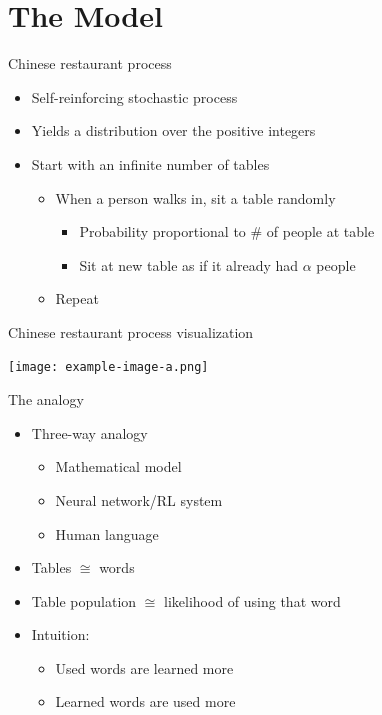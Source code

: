 \documentclass{beamer}
\newif\ifusevizzes
\begin{document}
\section{The Model}

\begin{frame}{Chinese restaurant process}
    \begin{itemize}
        \item Self-reinforcing stochastic process
        \item Yields a distribution over the positive integers
        \item Start with an infinite number of tables
            \begin{itemize}
                \item When a person walks in, sit a table randomly
                    \begin{itemize}
                        \item Probability proportional to \# of people at table
                        \item Sit at new table as if it already had $\alpha$ people
                    \end{itemize}
                \item Repeat
            \end{itemize}
    \end{itemize}
\end{frame}


\begin{frame}{Chinese restaurant process visualization}
    \begin{center}
        \ifusevizzes
            
        \else
            \texttt{[image: example-image-a.png]}
        \fi
    \end{center}
\end{frame}


\begin{frame}{The analogy}
    \begin{itemize}
        \item Three-way analogy
            \begin{itemize}
                \item Mathematical model
                \item Neural network/RL system
                \item Human language
            \end{itemize}
        \item Tables $\cong$ words
        \item Table population $\cong$ likelihood of using that word
        \item Intuition:
        \begin{itemize}
            \item Used words are learned more
            \item Learned words are used more
        \end{itemize}
    \end{itemize}
\end{frame}
\end{document}
